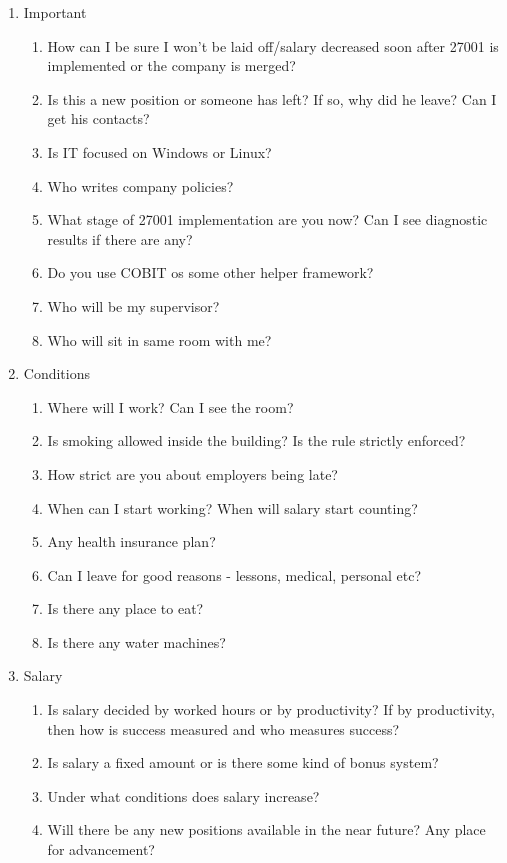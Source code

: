 \documentclass{article}
\begin{document}
\begin{enumerate}
\item Important
	\begin{enumerate}
		\item How can I be sure I won't be laid off/salary decreased soon after 27001 is implemented or the company is merged?
		\item Is this a new position or someone has left? If so, why did he leave? Can I get his contacts?
		\item Is IT focused on Windows or Linux?
		\item Who writes company policies?
		\item What stage of 27001 implementation are you now? Can I see diagnostic results if there are any?
		\item Do you use COBIT os some other helper framework?
		\item Who will be my supervisor?
		\item Who will sit in same room with me?
	\end{enumerate}

\item Conditions
	\begin{enumerate}
		\item Where will I work? Can I see the room?
		\item Is smoking allowed inside the building? Is the rule strictly enforced?
		\item How strict are you about employers being late?
		\item When can I start working? When will salary start counting?
		\item Any health insurance plan?
		\item Can I leave for good reasons - lessons, medical, personal etc?
		\item Is there any place to eat?
		\item Is there any water machines?
	\end{enumerate}

\item Salary
	\begin{enumerate}
		\item Is salary decided by worked hours or by productivity? If by productivity, then how is success measured and who measures success?
		\item Is salary a fixed amount or is there some kind of bonus system?
		\item Under what conditions does salary increase?
		\item Will there be any new positions available in the near future? Any place for advancement?
	\end{enumerate}
\end{enumerate}
\end{document}
